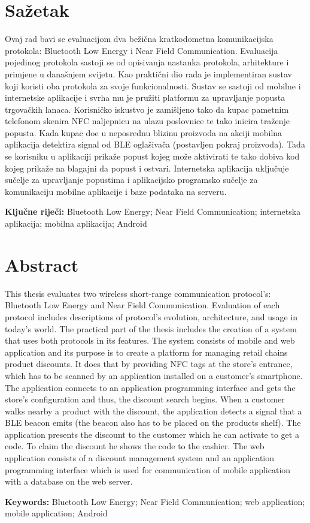 \chapter*{Sa\v{z}etak}
Ovaj rad bavi se evaluacijom dva be\v{z}i\v{c}na kratkodometna komunikacijska protokola: Bluetooth Low Energy i Near Field Communication. Evaluacija pojedinog protokola sastoji se od opisivanja nastanka protokola, arhitekture i primjene u dana\v{s}njem svijetu. Kao prakti\v{c}ni dio rada je implementiran sustav koji koristi oba protokola za svoje funkcionalnosti. Sustav se sastoji od mobilne i internetske aplikacije i svrha mu je pru\v{z}iti platformu za upravljanje popusta trgova\v{c}kih lanaca. Korisni\v{c}ko iskustvo je zami\v{s}ljeno tako da kupac pametnim telefonom skenira NFC naljepnicu na ulazu poslovnice te tako inicira tra\v{z}enje popusta. Kada kupac do\dj e u neposrednu blizinu proizvoda na akciji mobilna aplikacija detektira signal od BLE ogla\v{s}iva\v{c}a (postavljen pokraj proizvoda). Tada se korisniku u aplikaciji prika\v{z}e popust kojeg mo\v{z}e aktivirati te tako dobiva kod kojeg prika\v{z}e na blagajni da popust i ostvari. Internetska aplikacija uklju\v{c}uje su\v{c}elje za upravljanje popustima i aplikacijsko programsko su\v{c}elje za komunikaciju mobilne aplikacije i baze podataka na serveru.


\vspace{1.5\baselineskip}

\noindent \textbf{Klju\v{c}ne rije\v{c}i:} Bluetooth Low Energy; Near Field Communication; internetska aplikacija; mobilna aplikacija; Android

\chapter*{Abstract}

This thesis evaluates two wireless short-range communication protocol's: Bluetooth Low Energy and Near Field Communication. Evaluation of each protocol includes descriptions of protocol's evolution, architecture, and usage in today's world. The practical part of the thesis includes the creation of a system that uses both protocols in its features. The system consists of mobile and web application and its purpose is to create a platform for managing retail chains product discounts. It does that by providing NFC tags at the store's entrance, which has to be scanned by an application installed on a customer's smartphone. The application connects to an application programming interface and gets the store's configuration and thus, the discount search begins. When a customer walks nearby a product with the discount, the application detects a signal that a BLE beacon emits (the beacon also has to be placed on the products shelf). The application presents the discount to the customer which he can activate to get a code. To claim the discount he shows the code to the cashier. The web application consists of a discount management system and an application programming interface which is used for communication of mobile application with a database on the web server.

\vspace{1.5\baselineskip}
\noindent \textbf{Keywords:} Bluetooth Low Energy; Near Field Communication; web application; mobile application; Android
